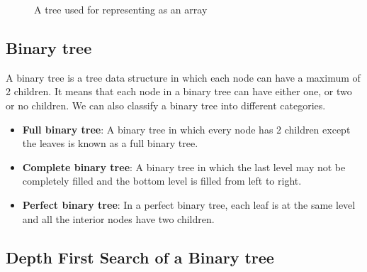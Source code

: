 \documentclass[a4paper,11pt]{book}
\begin{document}
\begin{figure}
    \centering
    \caption{A tree used for representing as an array}
    \label{fig:rep_tree}
\end{figure}


\subsection{Binary tree}

\noindent A binary tree is a tree data structure in which each node can have a maximum of 2 children. It means that each node in a binary tree can have either one, or two or no children. We can also classify a binary tree into different categories.
\begin{itemize}
    \item \textbf{Full binary tree}: A binary tree in which every node has 2 children except the leaves is known as a full binary tree.
    \item \textbf{Complete binary tree}: A binary tree in which the last level may not be completely filled and the bottom level is filled from left to right.
    \item \textbf{Perfect binary tree}: In a perfect binary tree, each leaf is at the same level and all the interior nodes have two children. 
\end{itemize}

\subsection{Depth First Search of a Binary tree}
\vspace{5mm}
\end{document}
